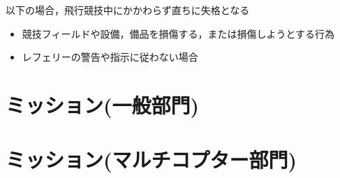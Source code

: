 \documentclass[a4paper,12pt,oneside]{jsarticle}
\begin{document}
以下の場合，飛行競技中にかかわらず直ちに失格となる
\begin{itemize}
  \item 競技フィールドや設備，備品を損傷する，または損傷しようとする行為
  \item レフェリーの警告や指示に従わない場合
\end{itemize}


\section{ミッション(一般部門)}

\section{ミッション(マルチコプター部門)}

\end{document}
